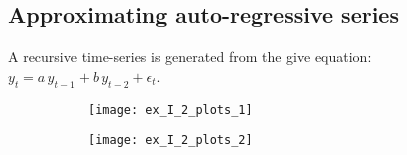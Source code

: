 
\subsection{Approximating auto-regressive series}

A recursive time-series is generated from the give equation: $y_t = a\,y_{t-1} + b\,y_{t-2} + \epsilon_t$.

\begin{figure}[H]
	\centering
	\begin{subfigure}[b]{.49\textwidth}
		\centering
		\texttt{[image: ex\_I\_2\_plots\_1]}
		\caption{}
		\label{fig:ex_I_2_plots_1}
	\end{subfigure}\hfill
	\begin{subfigure}[b]{.49\textwidth}
		\centering
		\texttt{[image: ex\_I\_2\_plots\_2]}
		\caption{}
		\label{fig:ex_I_2_plots_2}
	\end{subfigure}
\end{figure}

